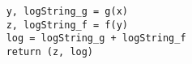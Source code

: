 \begin{verbatim}
    y, logString_g = g(x)
    z, logString_f = f(y)
    log = logString_g + logString_f
    return (z, log)
\end{verbatim}
